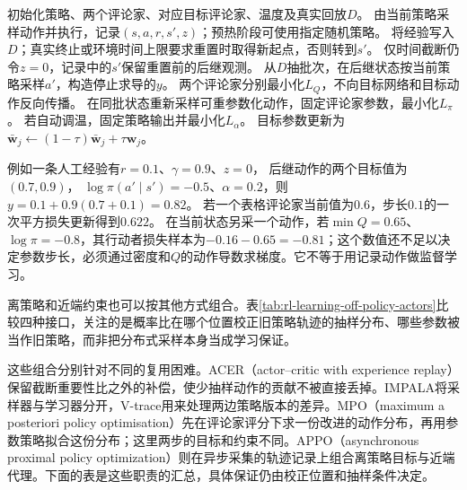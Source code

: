 \begin{algorithm}[SAC的真实数据与离策略更新循环]
  \label{alg:rl-learning-sac}
  \begin{algorithmic}[1]
    \State 初始化策略、两个评论家、对应目标评论家、温度及真实回放$D$。
      \State 由当前策略采样动作并执行，记录$(s,a,r,s',z)$；预热阶段可使用指定随机策略。
      \State 将经验写入$D$；真实终止或环境时间上限要求重置时取得新起点，否则转到$s'$。
      \State 仅时间截断仍令$z=0$，记录中的$s'$保留重置前的后继观测。
        \State 从$D$抽批次，在后继状态按当前策略采样$a'$，构造停止求导的$y$。
        \State 两个评论家分别最小化$L_Q$，不向目标网络和目标动作反向传播。
        \State 在同批状态重新采样可重参数化动作，固定评论家参数，最小化$L_\pi$。
        \State 若自动调温，固定策略输出并最小化$L_\alpha$。
        \State 目标参数更新为$\bar{\bm w}_j\gets(1-\tau)\bar{\bm w}_j+\tau\bm w_j$。
      \EndFor
    \EndFor
  \end{algorithmic}
\end{algorithm}

例如一条人工经验有$r=0.1$、$\gamma=0.9$、$z=0$，
后继动作的两个目标值为$(0.7,0.9)$，
$\log\pi(a'\mid s')=-0.5$、$\alpha=0.2$，则$y=0.1+0.9(0.7+0.1)=0.82$。
若一个表格评论家当前值为$0.6$，步长$0.1$的一次平方损失更新得到$0.622$。
在当前状态另采一个动作，若$\min Q=0.65$、$\log\pi=-0.8$，其行动者损失样本为$-0.16-0.65=-0.81$；这个数值还不足以决定参数步长，必须通过密度和$Q$的动作导数求梯度。它不等于用记录动作做监督学习。

离策略和近端约束也可以按其他方式组合。表\ref{tab:rl-learning-off-policy-actors}比较四种接口，关注的是概率比在哪个位置校正旧策略轨迹的抽样分布、哪些参数被当作旧策略，而非把分布式采样本身当成学习保证。

这些组合分别针对不同的复用困难。ACER（actor--critic with experience replay）保留截断重要性比之外的补偿，使少抽样动作的贡献不被直接丢掉。IMPALA将采样器与学习器分开，V-trace用来处理两边策略版本的差异。MPO（maximum a posteriori policy optimisation）先在评论家评分下求一份改进的动作分布，再用参数策略拟合这份分布；这里两步的目标和约束不同。APPO（asynchronous proximal policy optimization）则在异步采集的轨迹记录上组合离策略目标与近端代理。下面的表是这些职责的汇总，具体保证仍由校正位置和抽样条件决定。

